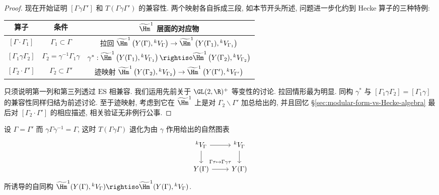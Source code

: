 \begin{proof}
	现在开始证明 $[\Gamma\gamma\Gamma']$ 和 $T(\Gamma\gamma\Gamma')$ 的兼容性. 两个映射各自拆成三段, 如本节开头所述, 问题进一步化约到 Hecke 算子的三种特例:
	\begin{center}\begin{tabular}{|c|c|c|} \hline
		算子 & 条件 & $\widetilde{\Hm}^1$ 层面的对应物 \\ \hline
		$[\Gamma \cdot \Gamma_1]$ & $\Gamma_1 \subset \Gamma$ & 拉回 $\widetilde{\Hm}^1 \left(Y(\Gamma), {}^k V_\Gamma \right) \to \widetilde{\Hm}^1\left( Y(\Gamma_1), {}^k V_{\Gamma_1}\right)$ \\ \hline
		$[\Gamma_1 \gamma \Gamma_2]$ & $\Gamma_2 = \gamma^{-1} \Gamma_1 \gamma$ & $\gamma^*: \widetilde{\Hm}^1\left(Y(\Gamma_1), {}^k V_{\Gamma_1} \right) \rightiso \widetilde{\Hm}^1\left(Y(\Gamma_2), {}^k V_{\Gamma_2} \right)$ \\ \hline
		$[\Gamma_2 \cdot \Gamma']$ & $\Gamma_2 \subset \Gamma'$ & 迹映射 $\widetilde{\Hm}^1\left(Y(\Gamma_2), {}^k V_{\Gamma_2} \right) \to \widetilde{\Hm}^1\left(Y(\Gamma'), {}^k V_{\Gamma'} \right)$ \\ \hline
	\end{tabular}\end{center}
	只须说明第一列和第三列透过 $\mathrm{ES}$ 相兼容. 我们运用先前关于 $\GL(2, \R)^+$ 等变性的讨论. 拉回情形最为明显. 同构 $\gamma^*$ 与 $[\Gamma_1 \gamma \Gamma_2] = [\Gamma_1 \gamma]$ 的兼容性同样归结为前述讨论. 至于迹映射, 考虑到它在 $\widetilde{\Hm}^1$ 上是对 $\Gamma_2 \backslash \Gamma'$ 加总给出的, 并且回忆 \S\ref{sec:modular-form-vs-Hecke-algebra} 最后对 $[\Gamma_2 \cdot \Gamma']$ 的相应描述, 相关验证无非例行公事.
\end{proof}

\begin{remark}\label{rem:Hecke-cohomology-deg}
	设 $\Gamma = \Gamma'$ 而 $\gamma\Gamma\gamma^{-1} = \Gamma$, 这时 $T(\Gamma\gamma\Gamma)$ 退化为由 $\gamma$ 作用给出的自然图表
	\[\begin{tikzcd}
		{}^k V_\Gamma \arrow[d] \arrow[r] & {}^k V_\Gamma \arrow[d] \\
		Y(\Gamma) \arrow[r, "{\Gamma\tau \mapsto \Gamma\gamma\tau}" inner sep=0.7em] & Y(\Gamma)
	\end{tikzcd}\]
	所诱导的自同构 $\widetilde{\Hm}^1(Y(\Gamma), {}^k V_\Gamma) \rightiso \widetilde{\Hm}^1(Y(\Gamma), {}^k V_\Gamma)$.
\end{remark}

